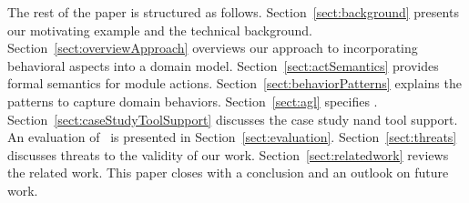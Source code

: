 The rest of the paper is structured as follows. Section~\ref{sect:background} presents our motivating example and the technical background. 
Section~\ref{sect:overviewApproach} overviews our approach to incorporating behavioral aspects into a domain model. 
Section~\ref{sect:actSemantics} provides formal semantics for module actions. Section~\ref{sect:behaviorPatterns} explains the patterns to capture domain behaviors.  
Section~\ref{sect:agl} specifies \agl. 
Section~\ref{sect:caseStudyToolSupport} discusses the case study n\orderman and tool support.
An evaluation of \agl~is presented in Section~\ref{sect:evaluation}. Section~\ref{sect:threats} discusses threats to the validity of our work.
Section~\ref{sect:relatedwork} reviews the related work. This paper closes with a conclusion and an outlook on future work.
